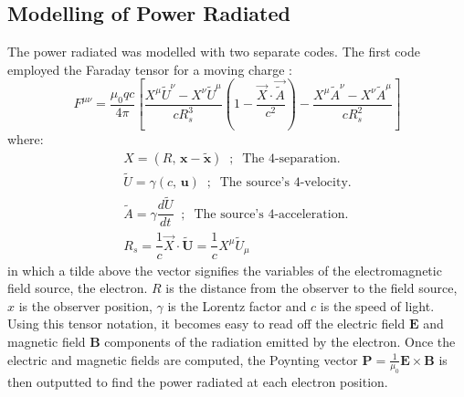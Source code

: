 \documentclass[a4paper,12pt, notitlepage]{article}
\begin{document}
\subsection{Modelling of Power Radiated}
The power radiated was modelled with two separate codes. The first code employed the Faraday tensor for a moving charge \cite{Jackson1999}:
\begin{equation}
    F^{\mu\nu} = \dfrac{\mu_{0}qc}{4\pi}\left[\dfrac{X^{\mu}\tilde{U}^{\nu}-X^{\nu}\tilde{U}^{\mu}}{cR_{s}^{3}}\left(1 - \dfrac{\vec{X}\cdot\vec{\tilde{A}}}{c^{2}}\right) - \dfrac{X^{\mu}\tilde{A}^{\nu}-X^{\nu}\tilde{A}^{\mu}}{cR_{s}^{2}} \right]
\end{equation}
where:
\begin{gather}
    X = (R,\, \boldsymbol{x} - \boldsymbol{\tilde{x}}) \;\; ;\;\; \textrm{The 4-separation.} \\
    \tilde{U} = \gamma(c,\, \boldsymbol{u}) \;\;;\;\; \textrm{The source's 4-velocity.} \\
    \tilde{A} = \gamma\dfrac{d\tilde{U}}{dt} \;\;;\;\; \textrm{The source's 4-acceleration.} \\
    R_{s} = \dfrac{1}{c}\vec{X}\cdot\boldsymbol{\tilde{U}} = \dfrac{1}{c}X^{\mu}\tilde{U}_{\mu}
\end{gather}
in which a tilde above the vector signifies the variables of the electromagnetic field source, the electron. $R$ is the distance from the observer to the field source, $x$ is the observer position, $\gamma$ is the Lorentz factor and $c$ is the speed of light. 
Using this tensor notation, it becomes easy to read off the electric field $\boldsymbol{E}$ and magnetic field $\boldsymbol{B}$ components of the radiation emitted by the electron. Once the electric and magnetic fields are computed, the Poynting vector $\boldsymbol{P} = \frac{1}{\mu_{0}}\boldsymbol{E}\times\boldsymbol{B}$ is then outputted to find the power radiated at each electron position. \\
 
\end{document}
